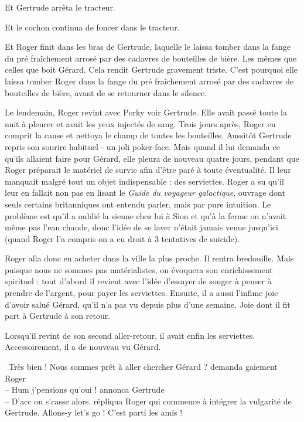 \documentclass[a5paper, 10pt, twoside]{book}
\newcommand{\cg}{\guillemotleft~}
\newcommand{\cd}{~\guillemotright}
\begin{document}
Et Gertrude arrêta le tracteur.

Et le cochon continua de foncer dans le tracteur.

Et Roger finit dans les bras de Gertrude, laquelle le laissa tomber dans la fange du pré fraîchement arrosé par des cadavres de bouteilles de bière. Les mêmes que celles que boit Gérard. Cela rendit Gertrude gravement triste. C'est pourquoi elle laissa tomber Roger dans la fange du pré fraîchement arrosé par des cadavres de bouteilles de bière, avant de se retourner dans le silence.

Le lendemain, Roger revint avec Porky voir Gertrude. Elle avait passé toute la nuit à pleurer et avait les yeux injectés de sang. Trois jours après, Roger en comprit la cause et nettoya le champ de toutes les bouteilles. Aussitôt Gertrude repris son sourire habituel - un joli poker-face. Mais quand il lui demanda ce qu'ils allaient faire pour Gérard, elle pleura de nouveau quatre jours, pendant que Roger préparait le matériel de survie afin d'être paré à toute éventualité. Il leur manquait malgré tout un objet indispensable : des serviettes. Roger a su qu'il leur en fallait non pas en lisant le \emph{Guide du voyageur galactique}, ouvrage dont seuls certains britanniques ont entendu parler, mais par pure intuition. Le problème est qu'il a oublié la sienne chez lui à Sion et qu'à la ferme on n'avait même pas l'eau chaude, donc l'idée de se laver n'était jamais venue jusqu'ici (quand Roger l'a compris on a eu droit à 3 tentatives de suicide).

Roger alla donc en acheter dans la ville la plus proche. Il rentra bredouille. Mais puisque nous ne sommes pas matérialistes, on évoquera son enrichissement spirituel : tout d'abord il revient avec l'idée d'essayer de songer à penser à prendre de l'argent, pour payer les serviettes. Ensuite, il a aussi l'infime joie d'avoir salué Gérard, qu'il n'a pas vu depuis plus d'une semaine. Joie dont il fit part à Gertrude à son retour.

Lorsqu'il revint de son second aller-retour, il avait enfin les serviettes. Accessoirement, il a de nouveau vu Gérard.

\cg Très bien ! Nous sommes prêt à aller chercher Gérard ? demanda gaiement Roger\\
-- Hum j'pensions qu'oui ! annonca Gertrude\\
-- D'acc on s'casse alors. répliqua Roger qui commence à intégrer la vulgarité de Gertrude. Allons-y let's go ! C'est parti les amis !\cd
\end{document}
